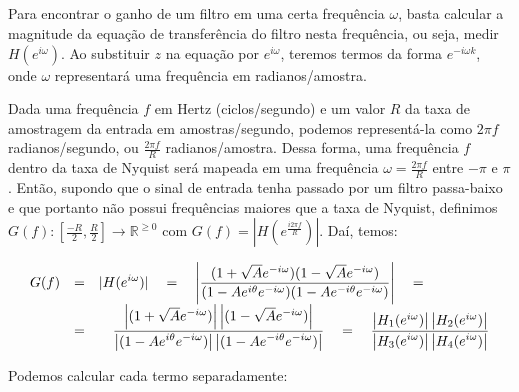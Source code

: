 \subsection{}

Para encontrar o ganho de um filtro em uma certa frequência $\omega$, basta
calcular a magnitude da equação de transferência do filtro nesta frequência, ou
seja, medir $H(e^{i\omega})$. Ao substituir $z$ na equação por $e^{i\omega}$,
teremos termos da forma $e^{-i\omega k}$, onde $\omega$ representará uma
frequência em radianos/amostra.

Dada uma frequência $f$ em Hertz (ciclos/segundo) e um valor $R$ da taxa de
amostragem da entrada em amostras/segundo, podemos representá-la como $2 \pi f$
radianos/segundo, ou $\frac{2 \pi f}{R}$ radianos/amostra. Dessa forma, uma
frequência $f$ dentro da taxa de Nyquist será mapeada em uma frequência $\omega
= \frac{2 \pi f}{R}$ entre $-\pi$ e $\pi$. Então, supondo que o sinal de
entrada tenha passado por um filtro passa-baixo e que portanto não possui
frequências maiores que a taxa de Nyquist, definimos
$G(f):[\frac{-R}{2},\frac{R}{2}] \rightarrow \mathbb{R}^{\ge 0}$ com $G(f) =
|H(e^{\frac{i 2 \pi f}{R}})|$. Daí, temos:

\[\displaystyle
\begin{array}{l c l}
  G(f) & = &\displaystyle |H(e^{i\omega})| \quad = \quad \left| \frac{(1+\sqrt{A}e^{-i\omega})(1-\sqrt{A}e^{-i\omega})}{(1-Ae^{i\theta}e^{-i\omega})(1-Ae^{-i\theta}e^{-i\omega})} \right| \quad = \\
       & = &\displaystyle \quad \frac{\left|(1+\sqrt{A}e^{-i\omega})\right|\left|(1-\sqrt{A}e^{-i\omega})\right|}{\displaystyle\left|(1-Ae^{i\theta}e^{-i\omega})\right|\left|(1-Ae^{-i\theta}e^{-i\omega})\right|} \quad = \quad \frac{\left| H_1(e^{i\omega})\right| \left| H_2(e^{i\omega})\right|}{\displaystyle\left| H_3(e^{i\omega})\right|\left| H_4(e^{i\omega})\right|}
\end{array}
\]

Podemos calcular cada termo separadamente:

